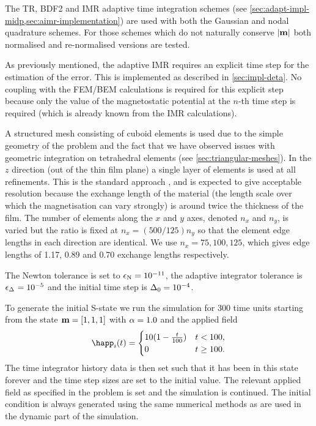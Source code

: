 The TR, BDF2 and IMR adaptive time integration schemes (see \cref{sec:adapt-impl-midp,sec:aimr-implementation}) are used with both the Gaussian and nodal quadrature schemes.
For those schemes which do not naturally conserve $\left|{\boldsymbol{\mathrm{m}}} \right|$ both normalised and re-normalised versions are tested.

As previously mentioned, the adaptive IMR requires an explicit time step for the estimation of the error.
This is implemented as described in \cref{sec:impl-deta}.
No coupling with the FEM/BEM calculations is required for this explicit step because only the value of the magnetostatic potential at the $n$-th time step is required (which is already known from the IMR calculations).

A structured mesh consisting of cuboid elements is used due to the simple geometry of the problem and the fact that we have observed issues with geometric integration on tetrahedral elements (see \cref{sec:triangular-meshes}).
In the $z$ direction (out of the thin film plane) a single layer of elements is used at all refinements.
This is the standard approach \cite{mumag-website}, and is expected to give acceptable resolution because the exchange length of the material (the length scale over which the magnetisation can vary strongly) is around twice the thickness of the film.
The number of elements along the $x$ and $y$ axes, denoted $n_x$ and $n_y$, is varied but the ratio is fixed at $n_x = (500/125) n_y$ so that the element edge lengths in each direction are identical.
We use $n_x=75,100,125$, which gives edge lengths of 1.17, 0.89 and 0.70 exchange lengths respectively.

The Newton tolerance is set to $\epsilon_{\mathrm{N}} = 10^{-11}$, the adaptive integrator tolerance is $\epsilon_{\Delta_{}} = 10^{-5}$ and the initial time step is $\Delta_{0} = 10^{-4}$.


To generate the initial S-state we run the simulation for 300 time units starting from the state $\boldsymbol{\mathrm{m}}=[1,1,1]$ with $\alpha = 1.0$ and the applied field
\begin{equation}
  \happ_i(t) =
  \begin{cases}
    10 (1- \frac{t}{100}) & t < 100, \\
    0 & t \geq 100.
  \end{cases}
\end{equation}
The time integrator history data is then set such that it has been in this state forever and the time step sizes are set to the initial value.
The relevant applied field as specified in the problem is set and the simulation is continued.
The initial condition is always generated using the same numerical methods as are used in the dynamic part of the simulation.

